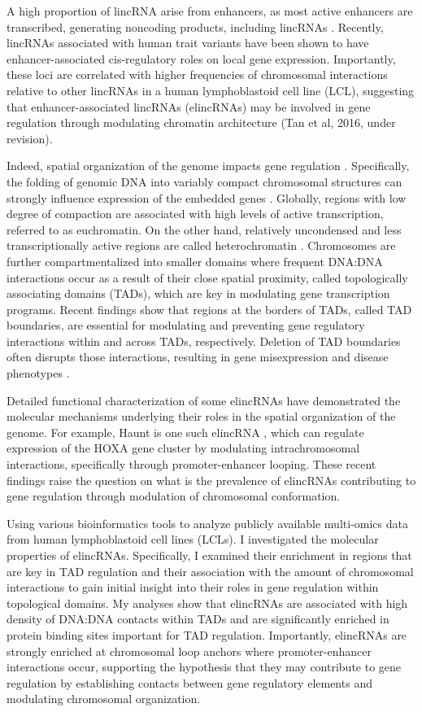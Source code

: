 \documentclass[11pt,a4paper]{report}
\begin{document}
A high proportion of lincRNA arise from enhancers, as most active enhancers are transcribed, generating noncoding products, including lincRNAs \cite{Guil2012}. Recently, lincRNAs associated with human trait variants have been shown to have enhancer-associated cis-regulatory roles on local gene expression. Importantly, these loci are correlated with higher frequencies of chromosomal interactions relative to other lincRNAs in a human lymphoblastoid cell line (LCL), suggesting that enhancer-associated lincRNAs (elincRNAs) may be involved in gene regulation through modulating chromatin architecture (Tan et al, 2016, under revision). 

Indeed, spatial organization of the genome impacts gene regulation \cite{Engreitz2016}⁠⁠. Specifically, the folding of genomic DNA into variably compact chromosomal structures can strongly influence expression of the embedded genes \cite{Gorkin2014}⁠⁠. Globally, regions with low degree of compaction are associated with high levels of active transcription, referred to as euchromatin. On the other hand, relatively uncondensed and less transcriptionally active regions are called heterochromatin \cite{Passarge1979}\cite{Tamaru2010}⁠. Chromosomes are further compartmentalized into smaller domains where frequent DNA:DNA interactions occur as a result of their close spatial proximity, called topologically associating domains (TADs), which are key in modulating gene transcription programs. Recent findings show that regions at the borders of TADs, called TAD boundaries, are essential for modulating and preventing gene regulatory interactions within and across TADs, respectively. Deletion of TAD boundaries often disrupts those interactions, resulting in gene misexpression and disease phenotypes \cite{Lupianez2015}⁠.

Detailed functional characterization of some elincRNAs have demonstrated the molecular mechanisms underlying their roles in the spatial organization of the genome. For example, Haunt is one such elincRNA \cite{Yin2015}⁠⁠, which can regulate expression of the HOXA gene cluster by modulating intrachromosomal interactions, specifically through promoter-enhancer looping. These recent findings raise the question on what is the prevalence of elincRNAs contributing to gene regulation through modulation of chromosomal conformation.

Using various bioinformatics tools to analyze publicly available multi-omics data from human lymphoblastoid cell lines (LCLs). I investigated the molecular properties of elincRNAs. Specifically, I examined their enrichment in regions that are key in TAD regulation and their association with the amount of chromosomal interactions to gain initial insight into their roles in gene regulation within topological domains. My analyses show that elincRNAs are associated with high density of DNA:DNA contacts within TADs and are significantly enriched in protein binding sites important for TAD regulation. Importantly,  elincRNAs are strongly enriched at chromosomal loop anchors where promoter-enhancer interactions occur, supporting the hypothesis that they may contribute to gene regulation by establishing contacts between gene regulatory elements and modulating chromosomal organization.
\end{document}
